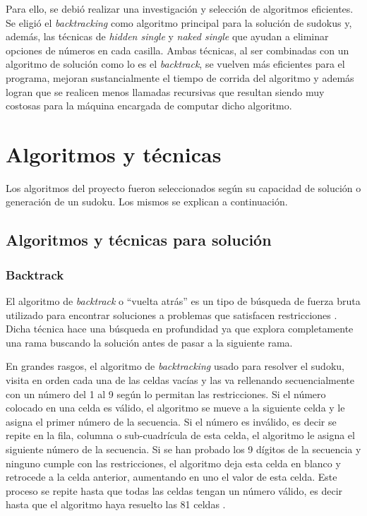 \documentclass[conference]{IEEEtran}
\begin{document}
Para ello, se debió realizar una investigación y selección de algoritmos eficientes. Se eligió el \textit{backtracking} como algoritmo principal para la solución de sudokus y, además, las técnicas de \textit{hidden single} y \textit{naked single} que ayudan a eliminar opciones de números en cada casilla. Ambas técnicas, al ser combinadas con un algoritmo de solución como lo es el \textit{backtrack}, se vuelven más eficientes para el programa, mejoran sustancialmente el tiempo de corrida del algoritmo y además logran que se realicen menos llamadas recursivas que resultan siendo muy costosas para la máquina encargada de computar dicho algoritmo.


\section{Algoritmos y técnicas}
Los algoritmos del proyecto fueron seleccionados según su capacidad de solución o generación de un sudoku. Los mismos se explican a continuación.

\subsection{Algoritmos y técnicas para solución}
\subsubsection{Backtrack}
El algoritmo de \textit{backtrack} o “vuelta atrás” es un tipo de búsqueda de fuerza bruta utilizado para encontrar soluciones a problemas que satisfacen restricciones \cite{vueltaAtras}. Dicha técnica hace una búsqueda en profundidad ya que explora completamente una rama buscando la solución antes de pasar a la siguiente rama.

En grandes rasgos, el algoritmo de \textit{backtracking} usado para resolver el sudoku, visita en orden cada una de las celdas vacías y las va rellenando secuencialmente con un número del 1 al 9 según lo permitan las restricciones. 
Si el número colocado en una celda es válido, el algoritmo se mueve a la siguiente celda y le asigna el primer número de la secuencia. Si el número es inválido, es decir se repite en la fila, columna o sub-cuadrícula de esta celda, el algoritmo le asigna el siguiente número de la secuencia. Si se han probado los 9 dígitos de la secuencia y ninguno cumple con las restricciones, el algoritmo deja esta celda en blanco y retrocede a la celda anterior, aumentando en uno el valor de esta celda. Este proceso se repite hasta que todas las celdas tengan un número válido, es decir hasta que el algoritmo haya resuelto las 81 celdas \cite{sudokuSolving}.
\end{document}
